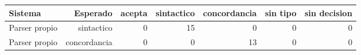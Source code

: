 \begin{tabular}{lrrrrrr}
\toprule
Sistema & Esperado & acepta & sintactico & concordancia & sin tipo & sin decision \\
\midrule
Parser propio & sintactico & 0 & 15 & 0 & 0 & 0 \\
Parser propio & concordancia & 0 & 0 & 13 & 0 & 0 \\
\bottomrule
\end{tabular}
